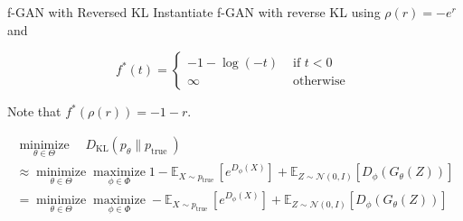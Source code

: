 \begin{frame}[allowframebreaks]

\begin{myconceptblock}{21.27}{f-GAN with Reversed KL}
    Instantiate f-GAN with reverse KL using $\rho(r)=-e^{r}$ and

    $$
    f^{*}(t)= \begin{cases}-1-\log (-t) & \text { if } t<0 \\ \infty & \text { otherwise }\end{cases}
    $$

    Note that $f^{*}(\rho(r))=-1-r$.

    $$
    \begin{gathered}
    \underset{\theta \in \Theta}{\operatorname{minimize}} \quad D_{\mathrm{KL}}\left(p_{\theta} \| p_{\text {true }}\right) \\
    \approx \underset{\theta \in \Theta}{\operatorname{minimize}} \underset{\phi \in \Phi}{\operatorname{maximize}} 1-\mathbb{E}_{X \sim p_{\text {true }}}\left[e^{D_{\phi}(X)}\right]+\mathbb{E}_{Z \sim \mathcal{N}(0, I)}\left[D_{\phi}\left(G_{\theta}(Z)\right)\right] \\
    =\underset{\theta \in \Theta}{\operatorname{minimize}} \underset{\phi \in \Phi}{\operatorname{maximize}}-\mathbb{E}_{X \sim p_{\text {true }}}\left[e^{D_{\phi}(X)}\right]+\mathbb{E}_{Z \sim \mathcal{N}(0, I)}\left[D_{\phi}\left(G_{\theta}(Z)\right)\right]
    \end{gathered}
    $$
\end{myconceptblock}

\end{frame}

